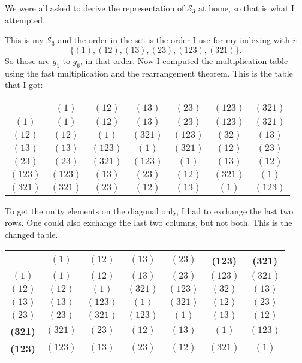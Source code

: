\documentclass[11pt, english, fleqn, DIV=15, headinclude, BCOR=1cm]{scrartcl}
\begin{document}
\begin{question}
    We were all asked to derive the representation of $\mathcal S_3$ at home,
    so that is what I attempted.

    This is my $\mathcal S_3$ and the order in the set is the order I use for
    my indexing with $i$:
    \[
        \{ (1), (12), (13), (23), (123), (321) \}.
    \]
    So those are $g_1$ to $g_6$, in that order. Now I computed the
    multiplication table using the fast multiplication and the rearrangement
    theorem. This is the table that I got:

    \begin{tabular}{c|cccccc}
        $     $ & $(1  )$ & $(12 )$ & $(13 )$ & $(23 )$ & $(123)$ & $(321)$ \\
        \midrule
        $(1  )$ & $(1  )$ & $(12 )$ & $(13 )$ & $(23 )$ & $(123)$ & $(321)$ \\
        $(12 )$ & $(12 )$ & $(1  )$ & $(321)$ & $(123)$ & $(32 )$ & $(13 )$ \\
        $(13 )$ & $(13 )$ & $(123)$ & $(1  )$ & $(321)$ & $(12 )$ & $(23 )$ \\
        $(23 )$ & $(23 )$ & $(321)$ & $(123)$ & $(1  )$ & $(13 )$ & $(12 )$ \\
        $(123)$ & $(123)$ & $(13 )$ & $(23 )$ & $(12 )$ & $(321)$ & $(1  )$ \\
        $(321)$ & $(321)$ & $(23 )$ & $(12 )$ & $(13 )$ & $(1  )$ & $(123)$ \\
    \end{tabular}

    To get the unity elements on the diagonal only, I had to exchange the last
    two rows. One could also exchange the last two columns, but not both. This
    is the changed table.

    \begin{tabular}{c|cccccc}
        $     $ & $(1  )$ & $(12 )$ & $(13 )$ & $(23 )$ & \textbf{(123)} & \textbf{(321)} \\
        \midrule
        $(1  )$ & $(1  )$ & $(12 )$ & $(13 )$ & $(23 )$ & $(123)$ & $(321)$ \\
        $(12 )$ & $(12 )$ & $(1  )$ & $(321)$ & $(123)$ & $(32 )$ & $(13 )$ \\
        $(13 )$ & $(13 )$ & $(123)$ & $(1  )$ & $(321)$ & $(12 )$ & $(23 )$ \\
        $(23 )$ & $(23 )$ & $(321)$ & $(123)$ & $(1  )$ & $(13 )$ & $(12 )$ \\
        \textbf{(321)} & $(321)$ & $(23 )$ & $(12 )$ & $(13 )$ & $(1  )$ & $(123)$ \\
        \textbf{(123)} & $(123)$ & $(13 )$ & $(23 )$ & $(12 )$ & $(321)$ & $(1  )$ \\
    \end{tabular}


\end{question}
\end{document}
